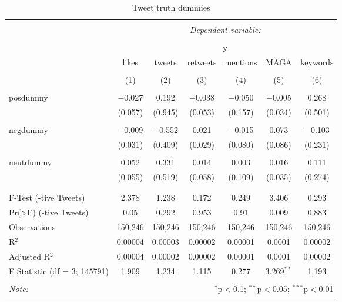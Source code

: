 
\begin{table}[!htbp] \centering 
  \caption{Tweet truth dummies} 
  \label{} 
\begin{tabular}{@{\extracolsep{5pt}}lcccccc} 
\\[-1.8ex]\hline 
\hline \\[-1.8ex] 
 & \multicolumn{6}{c}{\textit{Dependent variable:}} \\ 
\cline{2-7} 
\\[-1.8ex] & \multicolumn{6}{c}{y} \\ 
 & likes & tweets & retweets & mentions & MAGA & keywords \\ 
\\[-1.8ex] & (1) & (2) & (3) & (4) & (5) & (6)\\ 
\hline \\[-1.8ex] 
 posdummy & $-$0.027 & 0.192 & $-$0.038 & $-$0.050 & $-$0.005 & 0.268 \\ 
  & (0.057) & (0.945) & (0.053) & (0.157) & (0.034) & (0.501) \\ 
  & & & & & & \\ 
 negdummy & $-$0.009 & $-$0.552 & 0.021 & $-$0.015 & 0.073 & $-$0.103 \\ 
  & (0.031) & (0.409) & (0.029) & (0.080) & (0.086) & (0.231) \\ 
  & & & & & & \\ 
 neutdummy & 0.052 & 0.331 & 0.014 & 0.003 & 0.016 & 0.111 \\ 
  & (0.055) & (0.519) & (0.058) & (0.109) & (0.035) & (0.274) \\ 
  & & & & & & \\ 
\hline \\[-1.8ex] 
F-Test (-tive Tweets) & 2.378 & 1.238 & 0.172 & 0.249 & 3.406 & 0.293 \\ 
Pr(>F) (-tive Tweets) & 0.05 & 0.292 & 0.953 & 0.91 & 0.009 & 0.883 \\ 
Observations & 150,246 & 150,246 & 150,246 & 150,246 & 150,246 & 150,246 \\ 
R$^{2}$ & 0.00004 & 0.00003 & 0.00002 & 0.00001 & 0.0001 & 0.00002 \\ 
Adjusted R$^{2}$ & 0.00004 & 0.00002 & 0.00002 & 0.00001 & 0.0001 & 0.00002 \\ 
F Statistic (df = 3; 145791) & 1.909 & 1.234 & 1.115 & 0.277 & 3.269$^{**}$ & 1.193 \\ 
\hline 
\hline \\[-1.8ex] 
\textit{Note:}  & \multicolumn{6}{r}{$^{*}$p$<$0.1; $^{**}$p$<$0.05; $^{***}$p$<$0.01} \\ 
\end{tabular} 
\end{table} 
